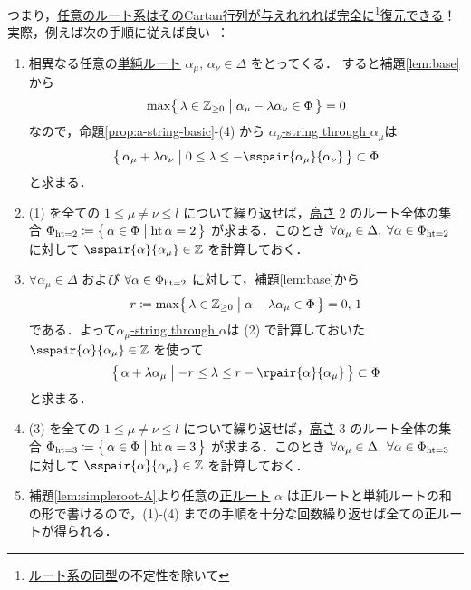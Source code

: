 \documentclass[rep_main]{subfiles}
\begin{document}
つまり，\underline{任意の\hyperref[ax:root-system]{ルート系}はその\hyperref[def:Cartan-matrix]{Cartan行列}が与えれれれば完全に\footnote{\hyperref[def:isom-root]{ルート系の同型}の不定性を除いて}復元できる}！
実際，例えば次の手順に従えば良い~\cite[p.56]{Humphreys1972introduction}：
\begin{enumerate}
	\item 相異なる任意の\hyperref[def:base-root]{単純ルート} $\alpha_\mu,\, \alpha_\nu \in \Delta$ をとってくる．
	すると補題\ref{lem:base}から 
	\begin{align}
		\max \bigl\{\, \lambda \in \mathbb{Z}_{\ge 0} \bigm| \alpha_\mu - \lambda \alpha_\nu \in \Phi \,\bigr\} = 0
	\end{align}
	なので，命題\ref{prop:a-string-basic}-(4) から
	\hyperref[def:a-sting]{$\alpha_\nu$-string through $\alpha_\mu$}は
	\begin{align}
		\bigl\{\, \alpha_\mu + \lambda \alpha_\nu \bigm| 0 \le \lambda \le -\sspair{\alpha_\mu}{\alpha_\nu} \,\bigr\} \subset \Phi
	\end{align}
	と求まる．
	\item (1) を全ての $1 \le \mu \neq \nu \le l$ について繰り返せば，\hyperref[def:base-root]{高さ} $2$ のルート全体の集合 $\Phi_{\operatorname{ht} = 2} \coloneqq \bigl\{\, \alpha \in \Phi \bigm| \operatorname{ht} \alpha = 2\,\bigr\}$ が求まる．このとき $\forall \alpha_\mu \in \Delta,\; \forall \alpha \in \Phi_{\operatorname{ht} = 2}$ に対して $\sspair{\alpha}{\alpha_\mu} \in \mathbb{Z}$ を計算しておく．
	\item $\forall \alpha_\mu \in \Delta$ および $\forall \alpha \in \Phi_{\operatorname{ht} = 2}$ に対して，補題\ref{lem:base}から
	\begin{align}
		r \coloneqq \max \bigl\{\, \lambda \in \mathbb{Z}_{\ge 0} \bigm| \alpha - \lambda \alpha_\mu \in \Phi \,\bigr\} = 0,\, 1
	\end{align}
	である．よって\hyperref[def:a-sting]{$\alpha_\mu$-string through $\alpha$}は (2) で計算しておいた $\sspair{\alpha}{\alpha_\mu} \in \mathbb{Z}$ を使って
	\begin{align}
		\bigl\{\, \alpha + \lambda \alpha_\mu \bigm| -r \le \lambda \le r-\rpair{\alpha}{\alpha_\mu} \,\bigr\} \subset \Phi
	\end{align}
	と求まる．
	\item (3) を全ての $1 \le \mu \neq \nu \le l$ について繰り返せば，\hyperref[def:base-root]{高さ} $3$ のルート全体の集合 $\Phi_{\operatorname{ht} = 3} \coloneqq \bigl\{\, \alpha \in \Phi \bigm| \operatorname{ht} \alpha = 3\,\bigr\}$ が求まる．このとき $\forall \alpha_\mu \in \Delta,\; \forall \alpha \in \Phi_{\operatorname{ht} = 3}$ に対して $\sspair{\alpha}{\alpha_\mu} \in \mathbb{Z}$ を計算しておく．
	\item 補題\ref{lem:simpleroot-A}より任意の\hyperref[def:base-root]{正ルート} $\alpha$ は正ルートと単純ルートの和の形で書けるので，(1)-(4) までの手順を十分な回数繰り返せば全ての正ルートが得られる．
\end{enumerate}
\end{document}
